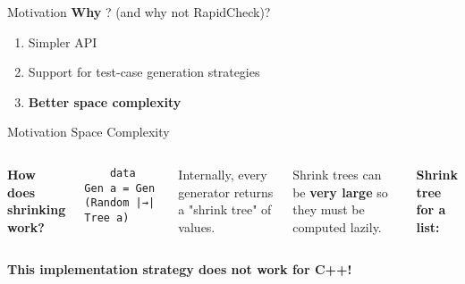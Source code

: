 \begin{frame}{\halcheck{} \textemdash{} Motivation}
  \textbf{Why} \halcheck{}? (and why not RapidCheck)?

  \begin{enumerate}
    \item Simpler API
    \item Support for test-case generation strategies
    \item \textbf{Better space complexity}
  \end{enumerate}
\end{frame}

\begin{frame}[fragile]{\halcheck{} \textemdash{} Motivation \textemdash{} Space Complexity}
  \begin{columns}[t]
    \textbf{How does shrinking work?}

    \bigskip

    \begin{verbatim}
    data Gen a = Gen (Random |→| Tree a)
    \end{verbatim}

    \bigskip

    Internally, every generator returns a "shrink tree" of values.

    \bigskip

    Shrink trees can be \textbf{very large} so they must be computed lazily.

    \textbf{Shrink tree for a list:}
  \end{columns}

  \pause{}

  \textbf{This implementation strategy does not work for C++!}
\end{frame}

